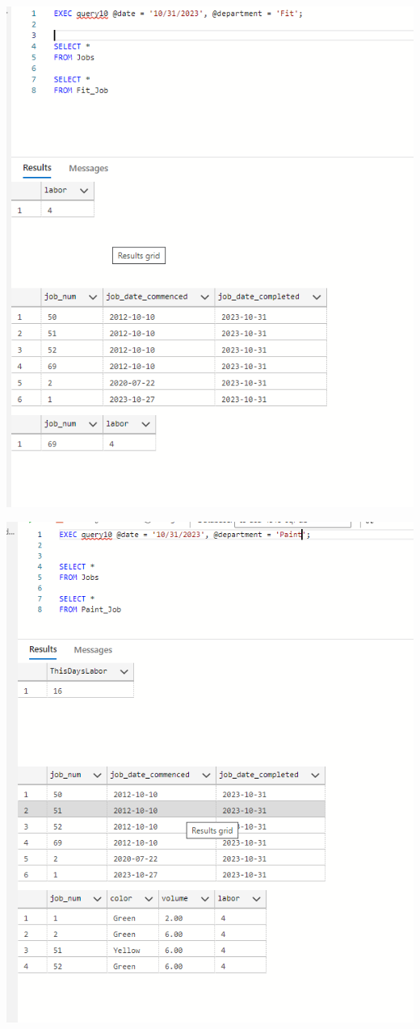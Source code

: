 \documentclass[11pt]{article}
\begin{document}
\begin{enumerate}
\includegraphics[width = \textwidth]{deptjob1.png}

\includegraphics[width = \textwidth]{deptjob2.png}


\end{enumerate}
\end{document}
